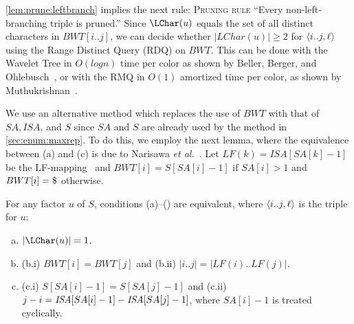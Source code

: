 \documentclass{article}
\begin{document}
\cref{lem:prune:leftbranch} implies the next rule: \textsc{Pruning rule} ``{Every non-left-branching triple is pruned.}''
Since $\LChar(u)$ equals the set of all distinct characters in $BWT[i..j]$, we can decide whether $|LChar(u)| \ge 2$ for $\langle i..j, \ell\rangle$ using the Range Distinct Query (RDQ) on $BWT$. 
This can be done with the Wavelet Tree in $O(log n)$ time per color as shown by Beller, Berger, and Ohlebusch~\cite{beller:berger:ohlebusch2012space:bbo}, or with the RMQ in $O(1)$ amortized time per color, as shown by Muthukrishnan~\cite{muthukrishnan2002efficient}.

We use an alternative method which replaces the use of $BWT$ with that of $SA, ISA$, and $S$ since $SA$ and $S$ are already used by the method in \cref{sec:enum:maxrep}. To do this, we employ the next lemma, where the equivalence between (a) and (c) is due to Narisawa \textit{et al.}~\cite[Lemma~10]{narisawa2007efficient}. 
Let $LF(k) = ISA[SA[k]-1]$ be the LF-mapping~\cite{Ferragina05:FM} and 
$BWT[i] = S[SA[i]-1]$ if $SA[i] > 1$ and $BWT[i]=\daller$ otherwise. 

\begin{lemma}
\label{lem:leftmaximal:character}
For any factor $u$ of $S$, conditions (a)--() are equivalent, where $\langle i..j, \ell\rangle$ is the triple for $u$:  
\begin{enumerate}[(a)]
\item $|\LChar(u)| = 1$. 
\item (b.i) $BWT[i]= BWT[j]$ and (b.ii) $|i..j| = |LF(i)..LF(j)|$. 
\item (c.i) $S[SA[i]-1] = S[SA[j]-1]$ and (c.ii) $j - i = \mathit{ISA}[SA[i]-1] - \mathit{ISA}[SA[j]-1]$, where $SA[i]-1$ is treated cyclically. 
\end{enumerate}
\end{lemma}
\end{document}
